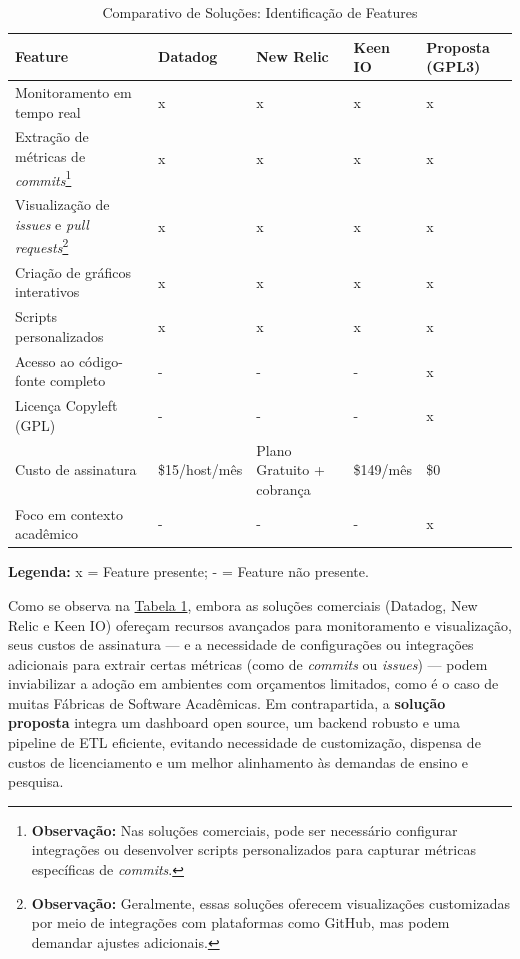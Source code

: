 \documentclass[
	12pt,           %
	openright,      %
	oneside,        %
	a4paper,        %
	brazil          %
]{abntex2}
\begin{document}
\begin{table}[htbp]
\centering
\caption{Comparativo de Soluções: Identificação de Features}
\label{tab:comparativo}
\renewcommand{\arraystretch}{1.2} %
\begin{tabular}{p{4cm} >{\centering\arraybackslash}p{1.8cm} >{\centering\arraybackslash}p{2.3cm} >{\centering\arraybackslash}p{1.8cm} >{\centering\arraybackslash}p{1.8cm}}
\hline
\textbf{Feature} & \textbf{Datadog} & \textbf{New Relic} & \textbf{Keen IO} & \textbf{Proposta (GPL3)} \\
\hline
Monitoramento em tempo real
  & x
  & x
  & x
  & x \\
Extração de métricas de \emph{commits}\footnote{\textbf{Observação:} Nas soluções comerciais, pode ser necessário configurar integrações ou desenvolver scripts personalizados para capturar métricas específicas de \emph{commits}.}
  & x
  & x
  & x
  & x \\
Visualização de \emph{issues} e \emph{pull requests}\footnote{\textbf{Observação:} Geralmente, essas soluções oferecem visualizações customizadas por meio de integrações com plataformas como GitHub, mas podem demandar ajustes adicionais.}
  & x
  & x
  & x
  & x \\
Criação de gráficos interativos
  & x
  & x
  & x
  & x \\
Scripts personalizados
  & x
  & x
  & x
  & x \\
Acesso ao código-fonte completo
  & -
  & -
  & -
  & x \\
Licença Copyleft (GPL)
  & -
  & -
  & -
  & x \\
Custo de assinatura
  & \$15/host/mês
  & Plano Gratuito + cobrança
  & \$149/mês
  & \$0 \\
Foco em contexto acadêmico
  & -
  & -
  & -
  & x \\
\hline
\end{tabular}
\begin{flushleft}
\small \textbf{Legenda:} x = Feature presente; - = Feature não presente.
\end{flushleft}
\end{table}

Como se observa na \hyperref[tab:comparativo]{Tabela 1}, embora as soluções comerciais (Datadog, New Relic e Keen IO) ofereçam recursos avançados para monitoramento e visualização, seus custos de assinatura — e a necessidade de configurações ou integrações adicionais para extrair certas métricas (como de \emph{commits} ou \emph{issues}) — podem inviabilizar a adoção em ambientes com orçamentos limitados, como é o caso de muitas Fábricas de Software Acadêmicas. Em contrapartida, a \textbf{solução proposta} integra um dashboard open source, um backend robusto e uma pipeline de ETL eficiente, evitando necessidade de customização, dispensa de custos de licenciamento e um melhor alinhamento às demandas de ensino e pesquisa.
\end{document}
